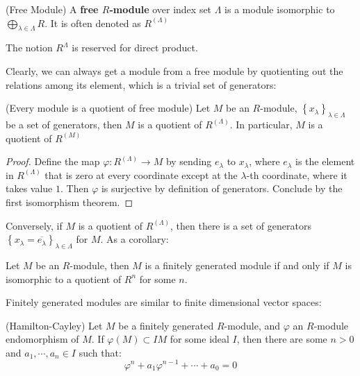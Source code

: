 \documentclass{note-eng}
\begin{document}
\begin{definition}
    (Free Module) A \textbf{free $R$-module} over index set $\Lambda$ is a module isomorphic to $\bigoplus_{\lambda \in \Lambda} R$. It is often denoted as $R^{(\Lambda)}$
\end{definition}

\begin{remark}
    The notion $R^{\Lambda}$ is reserved for direct product.
\end{remark}

Clearly, we can always get a module from a free module by quotienting out the relations among its element, which is a trivial set of generators:

\begin{proposition}
    (Every module is a quotient of free module) Let $M$ be an $R$-module, $\left\lbrace x_{\lambda} \right\rbrace_{\lambda \in \Lambda}$ be a set of generators, then $M$ is a quotient of $R^{(\Lambda)}$. In particular, $M$ is a quotient of $R^{(M)}$
\end{proposition}

\begin{proof}
    Define the map $\varphi: R^{(\Lambda)} \rightarrow M$ by sending $e_{\lambda}$ to $x_\lambda$, where $e_{\lambda}$ is the element in $R^{(\Lambda)}$ that is zero at every coordinate except at the $\lambda$-th coordinate, where it takes value $1$. Then $\varphi$ is surjective by definition of generators. Conclude by the first isomorphism theorem.
\end{proof}

Conversely, if $M$ is a quotient of $R^{(\Lambda)}$, then there is a set of generators $\left\lbrace x_\lambda = \overline{e_\lambda} \right\rbrace_{\lambda \in \Lambda}$ for $M$. As a corollary:

\begin{corollary}
    Let $M$ be an $R$-module, then $M$ is a finitely generated module if and only if $M$ is isomorphic to a quotient of $R^n$ for some $n$.
\end{corollary}

Finitely generated modules are similar to finite dimensional vector spaces:

\begin{theorem}
    (Hamilton-Cayley) Let $M$ be a finitely generated $R$-module, and $\varphi$ an $R$-module endomorphism of $M$. If $\varphi(M) \subset IM$ for some ideal $I$, then there are some $n \gt 0$ and $a_1, \cdots, a_n \in I$ such that:
    $$\varphi^n + a_1 \varphi^{n - 1} + \cdots + a_0 = 0$$
\end{theorem}
\end{document}
